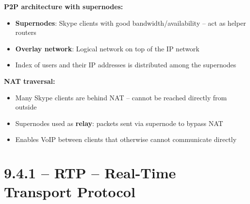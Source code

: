 \begin{tcolorbox}[keybox, title=Skype -- P2P VoIP Architecture]
\textbf{P2P architecture with supernodes:}
\begin{itemize}[nosep]
  \item \textbf{Supernodes}: Skype clients with good bandwidth/availability -- act as helper routers
  \item \textbf{Overlay network}: Logical network on top of the IP network
  \item Index of users and their IP addresses is distributed among the supernodes
\end{itemize}

\medskip
\textbf{NAT traversal:}
\begin{itemize}[nosep]
  \item Many Skype clients are behind NAT -- cannot be reached directly from outside
  \item Supernodes used as \textbf{relay}: packets sent via supernode to bypass NAT
  \item Enables VoIP between clients that otherwise cannot communicate directly
\end{itemize}
\end{tcolorbox}

\section{9.4.1 -- RTP -- Real-Time Transport Protocol}

